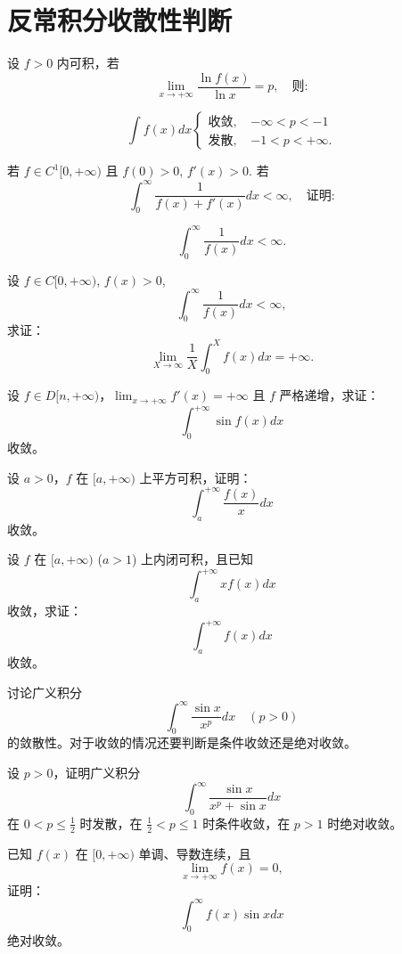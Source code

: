 \documentclass[lang=cn,10pt,thmcnt=section]{elegantbook}
\begin{document}
\section{反常积分收散性判断}
\begin{example}
	设 \( f > 0 \) 内可积，若  
\[
\lim_{x \to +\infty} \frac{\ln f(x)}{\ln x} = p, \quad \text{则:}
\]

\[
\int f(x) dx 
\begin{cases} 
\text{收敛, } & -\infty < p < -1 \\ 
\text{发散, } & -1 < p < +\infty.
\end{cases}
\]
\end{example}
\begin{example}
	若 \( f \in C^1[0,+\infty) \) 且 \( f(0) > 0 \), \( f'(x) > 0 \). 若  
\[
\int_0^\infty \frac{1}{f(x)+f'(x)} dx < \infty, \quad \text{证明:}
\]

\[
\int_0^\infty \frac{1}{f(x)} dx < \infty.
\]
\end{example}
\begin{example}
	设 \( f \in C[0,+\infty) \), \( f(x) > 0 \),  
\[
\int_{0}^{\infty} \frac{1}{f(x)} dx < \infty,
\]
求证：  
\[
\lim_{X \to \infty} \frac{1}{X} \int_{0}^{X} f(x) dx = +\infty.
\]
\end{example}
\begin{example}
	设 \( f \in D[n, +\infty) \)，\(\lim_{x \to +\infty} f'(x) = +\infty\) 且 \( f \) 严格递增，求证：  
\[
\int_0^{+\infty} \sin f(x) dx
\]  
收敛。
\end{example}
\begin{example}
	设 \( a > 0 \)，\( f \) 在 \([a, +\infty)\) 上平方可积，证明：  
\[
\int_a^{+\infty} \frac{f(x)}{x} dx
\]  
收敛。
\end{example}
\begin{example}
	设 \( f \) 在 \([a, +\infty)\) (\( a > 1 \)) 上内闭可积，且已知  
\[
\int_a^{+\infty} x f(x) dx
\]  
收敛，求证：  
\[
\int_a^{+\infty} f(x) dx
\]  
收敛。
\end{example}
\begin{example}
	讨论广义积分 
\[
\int_{0}^{\infty} \frac{\sin x}{x^p} dx \quad ( p > 0 )
\] 
的敛散性。对于收敛的情况还要判断是条件收敛还是绝对收敛。

设 \( p > 0 \)，证明广义积分 
\[
\int_{0}^{\infty} \frac{\sin x}{x^p + \sin x} dx
\] 
在 \( 0 < p \leq \frac{1}{2} \) 时发散，在 \(\frac{1}{2} < p \leq 1\) 时条件收敛，在 \( p > 1 \) 时绝对收敛。
\end{example}
\begin{example}
	已知 \( f(x) \) 在 \([0, +\infty)\) 单调、导数连续，且  
\[
\lim_{x \to +\infty} f(x) = 0,
\] 
证明：
\[
\int_{0}^{\infty} f(x) \sin x dx
\] 
绝对收敛。
\end{example}
\end{document}
